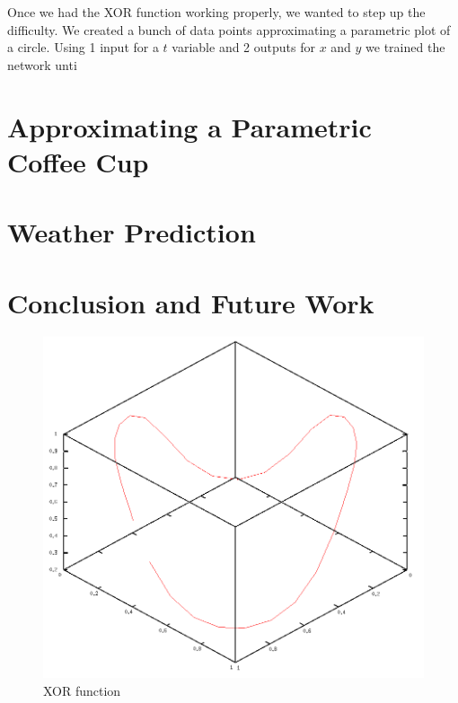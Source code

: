 \documentclass{article}
\begin{document}
\begin{multicols}{2}
Once we had the XOR function working properly, we wanted to step up the difficulty. We created a bunch of data points approximating a parametric plot of a circle. Using 1 input for a $t$ variable and 2 outputs for $x$ and $y$ we trained the network unti

\section{Approximating a Parametric Coffee Cup}

\section{Weather Prediction}

\section{Conclusion and Future Work}




\end{multicols}

\begin{figure}[tb]
	\begin{center}
		\includegraphics[scale=0.5]{img/xor1}
	\end{center}
	\caption{XOR function}
	\label{fig:xor1}
\end{figure}
\end{document}
